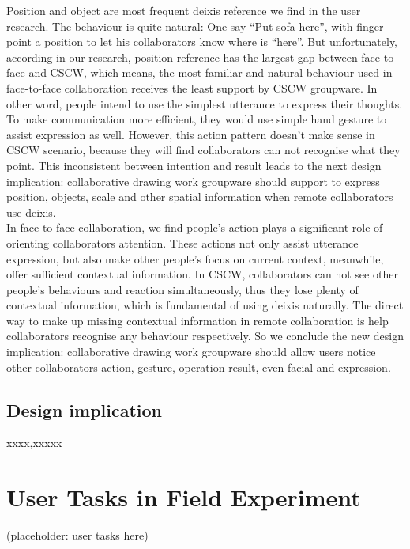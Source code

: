 \documentclass[12pt,twoside]{article}
\begin{document}
Position and object are most frequent deixis reference we find in the user research. The behaviour is quite natural: One say “Put sofa here”, with finger point a position to let his collaborators know where is “here”. But unfortunately, according in our research, position reference has the largest gap between face-to-face and CSCW, which means, the most familiar and natural behaviour used in face-to-face collaboration receives the least support by CSCW groupware. In other word, people intend to use the simplest utterance to express their thoughts. To make communication more efficient, they would use simple hand gesture to assist expression as well. However, this action pattern doesn’t make sense in CSCW scenario, because they will find collaborators can not recognise what they point. This inconsistent between intention and result leads to the next design implication: collaborative drawing work groupware should support to express position, objects, scale and other spatial information when remote collaborators use deixis.\\
In face-to-face collaboration, we find people’s action plays a significant role of orienting collaborators attention. These actions not only assist utterance expression, but also make other people’s focus on current context, meanwhile, offer sufficient contextual information. In CSCW, collaborators can not see other people’s behaviours and reaction simultaneously, thus they lose plenty of contextual information, which is fundamental of using deixis naturally. The direct way to make up missing contextual information in remote collaboration is help collaborators recognise any behaviour respectively. So we conclude the new design implication: collaborative drawing work groupware should allow users notice other collaborators action, gesture, operation result, even facial and expression. 

\subsection{Design implication}
xxxx,xxxxx




\appendix
\section{User Tasks in Field Experiment}
\label{appdx:user tasks}

(placeholder: user tasks here)
\end{document}

